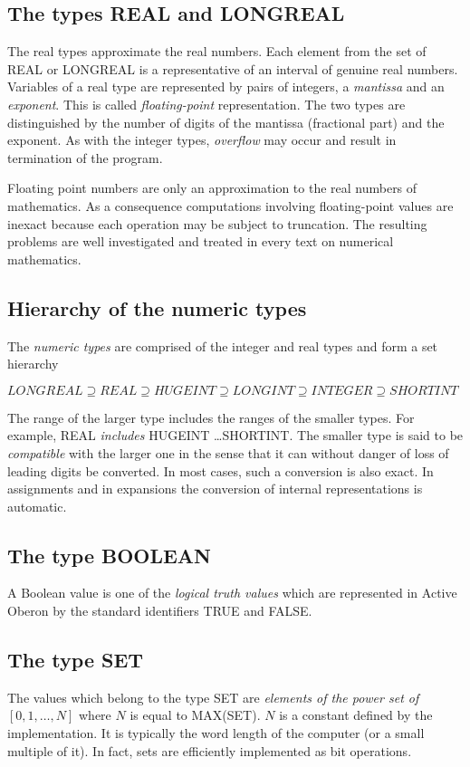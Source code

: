 \documentclass[a4paper,11pt]{article}
\begin{document}
\subsection{The types REAL and LONGREAL} \label{subsection:RealTypes}
The real types approximate the real numbers. Each element from the set of REAL or LONGREAL is a representative of an interval of genuine real numbers. Variables of a real type are represented by pairs of integers, a {\em mantissa} and an {\em exponent}. This is called {\em floating-point} representation. The two types are distinguished by the number of digits of the mantissa (fractional part) and the exponent. As with the integer types, {\em overflow} may occur and result in termination of the program.

Floating point numbers are only an approximation to the real numbers of mathematics. As a consequence computations involving floating-point values are inexact because each operation may be subject to truncation. The resulting problems are well investigated and treated in every text on numerical mathematics.

\subsection{Hierarchy of the numeric types} \label{subsection:HierarchyNumericTypes}
The {\em numeric types} are comprised of the integer and real types and form a set hierarchy

$LONGREAL \supseteq REAL \supseteq HUGEINT \supseteq LONGINT \supseteq INTEGER \supseteq SHORTINT$

The range of the larger type includes the ranges of the smaller types. For example, REAL {\em includes} HUGEINT \ldots SHORTINT. The smaller type is said to be {\em compatible} with the larger one in the sense that it can without danger of loss of leading digits be converted. In most cases, such a conversion is also exact. In assignments and in expansions the conversion of internal representations is automatic.

\subsection{The type BOOLEAN} \label{subsection:BooleanType}
A Boolean value is one of the {\em logical truth values} which are represented in Active Oberon by the standard identifiers TRUE and FALSE.

\subsection{The type SET} \label{subsection:SetType}
The values which belong to the type SET are {\em elements of the power set of} $[0, 1, \ldots, N]$ where $N$ is equal to MAX(SET). $N$ is a constant defined by the implementation. It is typically the word length of the computer (or a small multiple of it). In fact, sets are efficiently implemented as bit operations.
\end{document}
